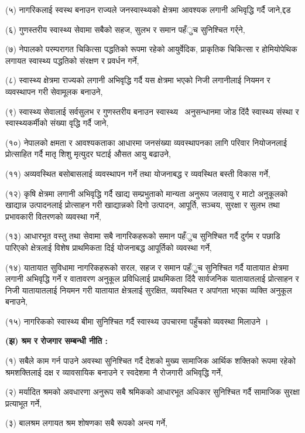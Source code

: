 (५) नागरिकलाई स्वस्थ बनाउन राज्यले जनस्वास्थ्यको क्षेत्रमा आवश्यक लगानी अभिवृद्धि गर्दै जाने,द्दड

(६) गुणस्तरीय स्वास्थ्य सेवामा सबैको सहज, सुलभ र समान पहँुच सुनिश्चित गर्र्ने,

(७) नेपालको परम्परागत चिकित्सा पद्धतिको रूपमा रहेको आयुर्वेदिक, प्राकृतिक चिकित्सा र होमियोपेथिक लगायत स्वास्थ्य पद्धतिको संरक्षण र प्रवर्धन गर्ने,

(८) स्वास्थ्य क्षेत्रमा राज्यको लगानी अभिवृद्धि गर्दै यस क्षेत्रमा भएको निजी लगानीलाई नियमन र व्यवस्थापन गरी सेवामूलक बनाउने,

(९) स्वास्थ्य सेवालाई सर्वसुलभ र गुणस्तरीय बनाउन स्वास्थ्य  अनुसन्धानमा जोड दिंदै स्वास्थ्य संस्था र स्वास्थ्यकर्मीको संख्या वृद्धि गर्दै जाने,

(१०) नेपालको क्षमता र आवश्यकताका आधारमा जनसंख्या व्यवस्थापनका लागि परिवार नियोजनलाई प्रोत्साहित गर्दै मातृ शिशु मृत्युदर घटाई औसत आयु बढाउने,

(११) अव्यवस्थित बसोबासलाई व्यवस्थापन गर्ने तथा योजनाबद्ध र व्यवस्थित बस्ती विकास गर्ने,

(१२) कृषि क्षेत्रमा लगानी अभिवृद्धि गर्दै खाद्य सम्प्रभुताको मान्यता अनुरूप जलवायु र माटो अनुकूलको खाद्यान्न उत्पादनलाई प्रोत्साहन गरी खाद्यान्नको दिगो उत्पादन, आपूर्ति, सञ्चय, सुरक्षा र सुलभ तथा प्रभावकारी वितरणको व्यवस्था गर्ने,

(१३) आधारभूत वस्तु तथा सेवामा सबै नागरिकहरूको समान पहँुच सुनिश्चित गर्दै दुर्गम र पछाडि पारिएको क्षेत्रलाई विशेष प्राथमिकता दिई योजनाबद्ध आपूर्तिको व्यवस्था गर्ने,

(१४) यातायात सुविधामा नागरिकहरूको सरल, सहज र समान पहँुच सुनिश्चित गर्दै यातायात क्षेत्रमा लगानी अभिवृद्धि गर्ने र वातावरण अनुकूल प्रविधिलाई प्राथमिकता दिंदै सार्वजनिक यातायातलाई प्रोत्साहन र निजी यातायातलाई नियमन गरी यातायात क्षेत्रलाई सुरक्षित, व्यवस्थित र अपांगता भएका व्यक्ति अनुकूल बनाउने,

(१५) नागरिकको स्वास्थ्य बीमा सुनिश्चित गर्दै स्वास्थ्य उपचारमा पहुँचको व्यवस्था मिलाउने ।

\textbf{(झ) श्रम र रोजगार सम्बन्धी नीति :}

(१) सबैले काम गर्न पाउने अवस्था सुनिश्चित गर्दै देशको मुख्य सामाजिक आर्थिक शक्तिको रूपमा रहेको श्रमशक्तिलाई दक्ष र व्यावसायिक बनाउने र स्वदेशमा नै रोजगारी अभिवृद्धि गर्ने,

(२) मर्यादित श्रमको अवधारणा अनुरूप सबै श्रमिकको आधारभूत अधिकार सुनिश्चित गर्दै सामाजिक सुरक्षा प्रत्याभूत गर्ने,

(३) बालश्रम लगायत श्रम शोषणका सबै रूपको अन्त्य गर्ने,

